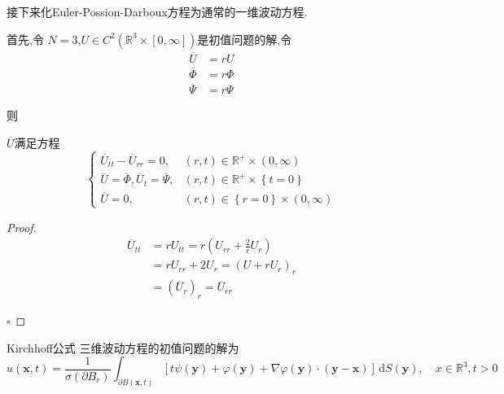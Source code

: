 \documentclass[../../PDE.tex]{subfiles}
\begin{document}
接下来化Euler-Possion-Darboux方程为通常的一维波动方程.

首先,令 \(  N = 3  \),\(  U  \in C^{2}\left( \mathbb{R} ^{3}\times \left[ 0,\infty \right]  \right) \)是初值问题的解,令 \[
\begin{aligned}
\overline{U}& = rU\\ 
 \overline{\Phi }& =  r\Phi \\ 
  \overline{\Psi }& =  r\Psi  
\end{aligned}
\]  


则 

\begin{theorem}
    \(  \overline{U}  \)满足方程 
    \begin{equation}
      \begin{cases}   \overline{U}_{tt}- \overline{U}_{rr}= 0,&\left( r,t \right)\in \mathbb{R} ^{+ }\times \left( 0,\infty \right)\\ 
       \overline{U}=  \overline{\Phi }, \overline{U}_{t}=  \overline{\Psi },&\left( r,t \right) \in \mathbb{R} ^{+ }\times \left\{ t= 0 \right\}\\ 
        \overline{U}= 0    ,& \left( r,t \right)\in \left\{ r= 0 \right\}\times \left( 0,\infty \right)  \end{cases} 
    \end{equation} 
\end{theorem}


\begin{proof}
    \[
    \begin{aligned}
    \overline{U}_{tt}&= rU_{tt} = r\left( U_{rr}+  \frac{2 }{r }U_{r}  \right)\\ 
     & = rU_{rr}+ 2U_{r}= \left( U+ rU_{r} \right)_{r}\\ 
      & =  \left( \overline{U}_{r} \right)_{r}= \overline{U}_{rr}   
    \end{aligned}
    \]

    \hfill $\square$
\end{proof}



\begin{theorem}{Kirchhoff公式}
    三维波动方程的初值问题的解为 \[
    u\left( \mathbf{x},t \right)= \frac{1}{ \sigma \left(  \partial B_{r} \right) } \int _{ \partial B\left( \mathbf{x},t \right) } \left[ t\psi \left( \mathbf{y} \right)+  \varphi \left( \mathbf{y} \right)+  \nabla  \varphi \left( \mathbf{y} \right)\cdot \left( \mathbf{y}-\mathbf{x} \right)     \right]\,\mathrm{d} S\left( \mathbf{y} \right),\quad x\in \mathbb{R} ^{3},t> 0  
    \]
\end{theorem}
\end{document}
